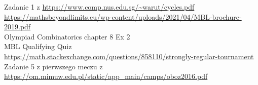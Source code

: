
 Zadanie 1 z \url{https://www.comp.nus.edu.sg/~warut/cycles.pdf} \\
 \url{https://mathsbeyondlimits.eu/wp-content/uploads/2021/04/MBL-brochure-2019.pdf} \\
 Olympiad Combinatorics chapter 8 Ex 2 \\
 MBL Qualifying Quiz \\
 \url{https://math.stackexchange.com/questions/858110/strongly-regular-tournament} \\
 Zadanie 5 z pierwszego meczu z \url{https://om.mimuw.edu.pl/static/app_main/camps/oboz2016.pdf} \\


